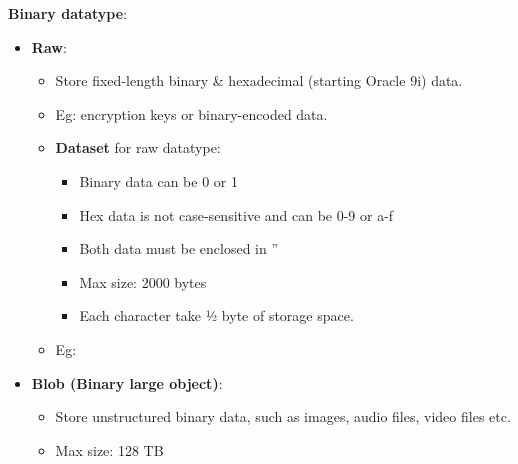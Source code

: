 \begin{flushleft}
		\item \textbf{Binary datatype}:
		\begin{itemize}
			\item \textbf{Raw}: 
			\begin{itemize}
				\item Store fixed-length binary \& hexadecimal (starting Oracle 9i) data.
				\item Eg: encryption keys or binary-encoded data.
				\item \textbf{Dataset} for raw datatype:
				\begin{itemize}
					\item Binary data can be 0 or 1
					\item Hex data is not case-sensitive and can be 0-9 or a-f
					\item Both data must be enclosed in ''
					\item Max size: 2000 bytes
					\item Each character take ½ byte of storage space.
				\end{itemize}
				\bigskip
				\item Eg:
				
			\end{itemize}

			\item \textbf{Blob (Binary large object)}:
			\begin{itemize}
				\item Store unstructured binary data, such as images, audio files, video files etc.
				\item Max size: 128 TB
				\bigskip

			


\end{itemize}
\end{itemize}
\end{flushleft}
